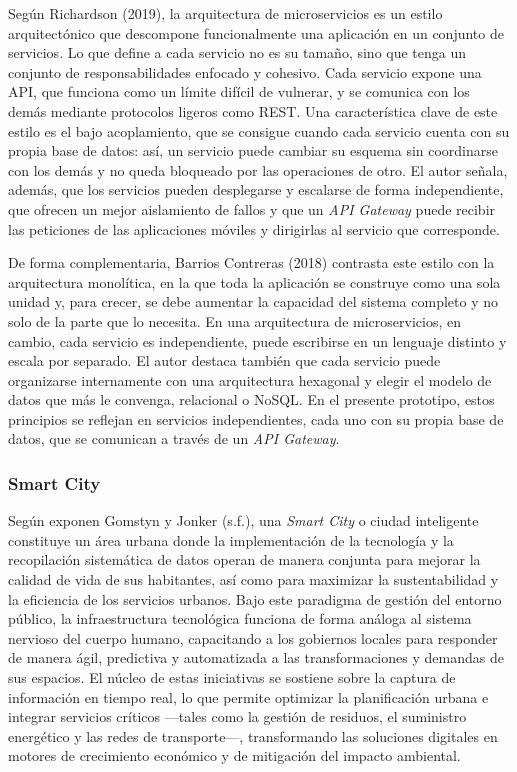 \documentclass[12pt,a4paper]{article}
\begin{document}
Según Richardson (2019), la arquitectura de microservicios es un estilo arquitectónico que descompone funcionalmente una aplicación en un conjunto de servicios. Lo que define a cada servicio no es su tamaño, sino que tenga un conjunto de responsabilidades enfocado y cohesivo. Cada servicio expone una API, que funciona como un límite difícil de vulnerar, y se comunica con los demás mediante protocolos ligeros como REST. Una característica clave de este estilo es el bajo acoplamiento, que se consigue cuando cada servicio cuenta con su propia base de datos: así, un servicio puede cambiar su esquema sin coordinarse con los demás y no queda bloqueado por las operaciones de otro. El autor señala, además, que los servicios pueden desplegarse y escalarse de forma independiente, que ofrecen un mejor aislamiento de fallos y que un \textit{API Gateway} puede recibir las peticiones de las aplicaciones móviles y dirigirlas al servicio que corresponde.

De forma complementaria, Barrios Contreras (2018) contrasta este estilo con la arquitectura monolítica, en la que toda la aplicación se construye como una sola unidad y, para crecer, se debe aumentar la capacidad del sistema completo y no solo de la parte que lo necesita. En una arquitectura de microservicios, en cambio, cada servicio es independiente, puede escribirse en un lenguaje distinto y escala por separado. El autor destaca también que cada servicio puede organizarse internamente con una arquitectura hexagonal y elegir el modelo de datos que más le convenga, relacional o NoSQL. En el presente prototipo, estos principios se reflejan en servicios independientes, cada uno con su propia base de datos, que se comunican a través de un \textit{API Gateway}.

\subsubsection{Smart City}

Según exponen Gomstyn y Jonker (s.f.), una \textit{Smart City} o ciudad inteligente constituye un área urbana donde la implementación de la tecnología y la recopilación sistemática de datos operan de manera conjunta para mejorar la calidad de vida de sus habitantes, así como para maximizar la sustentabilidad y la eficiencia de los servicios urbanos. Bajo este paradigma de gestión del entorno público, la infraestructura tecnológica funciona de forma análoga al sistema nervioso del cuerpo humano, capacitando a los gobiernos locales para responder de manera ágil, predictiva y automatizada a las transformaciones y demandas de sus espacios. El núcleo de estas iniciativas se sostiene sobre la captura de información en tiempo real, lo que permite optimizar la planificación urbana e integrar servicios críticos —tales como la gestión de residuos, el suministro energético y las redes de transporte—, transformando las soluciones digitales en motores de crecimiento económico y de mitigación del impacto ambiental.
\end{document}
